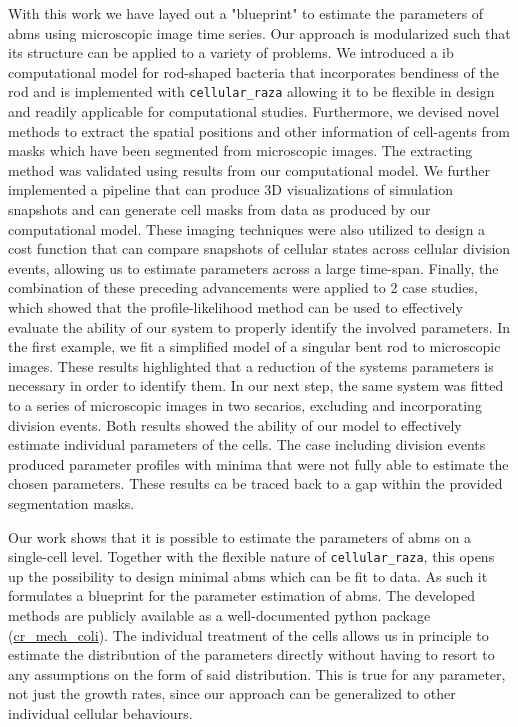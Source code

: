 \documentclass{article}
\begin{document}
With this work we have layed out a "blueprint" to estimate the parameters of \acp{abm} using
microscopic image time series.
Our approach is modularized such that its structure can be applied to a variety of problems.
We introduced a \ac{ib} computational model for rod-shaped bacteria that incorporates bendiness of
the rod and is implemented with \texttt{cellular\_raza} allowing it to be flexible in design and
readily applicable for computational studies.
Furthermore, we devised novel methods to extract the spatial positions and other information of
cell-agents from masks which have been segmented from microscopic images.
The extracting method was validated using results from our computational model.
We further implemented a pipeline that can produce 3D visualizations of simulation snapshots and can
generate cell masks from data as produced by our computational model.
These imaging techniques were also utilized to design a cost function that can compare snapshots
of cellular states across cellular division events, allowing us to estimate parameters across a
large time-span.
Finally, the combination of these preceding advancements were applied to 2 case studies, which showed
that the profile-likelihood method can be used to effectively evaluate the ability of our system to
properly identify the involved parameters.
In the first example, we fit a simplified model of a singular bent rod to microscopic images.
These results highlighted that a reduction of the systems parameters is necessary in order to
identify them.
In our next step, the same system was fitted to a series of microscopic images in two secarios,
excluding and incorporating division events.
Both results showed the ability of our model to effectively estimate individual parameters of the
cells.
The case including division events produced parameter profiles with minima that were not fully able
to estimate the chosen parameters.
These results ca be traced back to a gap within the provided segmentation masks.

Our work shows that it is possible to estimate the parameters of \acp{abm} on a single-cell level.
Together with the flexible nature of \texttt{cellular\_raza}, this opens up the possibility to
design minimal \acp{abm} which can be fit to data.
As such it formulates a blueprint for the parameter estimation of \acp{abm}.
The developed methods are publicly available as a well-documented python package
(\href{https://github.com/jonaspleyer/cr_mech_coli}{cr\_mech\_coli}).
The individual treatment of the cells allows us in principle to estimate the distribution of the
parameters directly without having to resort to any assumptions on the form of said distribution.
This is true for any parameter, not just the growth rates, since our approach can be generalized to
other individual cellular behaviours.
\end{document}

